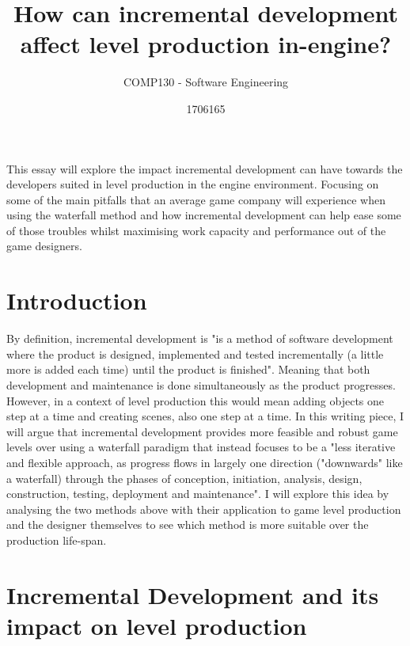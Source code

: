 \documentclass{scrartcl}
\title{How can incremental development affect level production in-engine?}
\subtitle{COMP130 - Software Engineering}
\author{1706165}
\begin{document}
\maketitle

This essay will explore the impact incremental development can have towards the developers suited in level production in the engine environment. Focusing on some of the main pitfalls that an average game company will experience when using the waterfall method and how incremental development can help ease some of those troubles whilst maximising work capacity and performance out of the game designers. 
\section{Introduction}

By definition, incremental development is \cite{1} "is a method of software development where the product is designed, implemented and tested incrementally (a little more is added each time) until the product is finished". Meaning that both development and maintenance is done simultaneously as the product progresses. However, in a context of level production this would mean adding objects one step at a time and creating scenes, also one step at a time. In this writing piece, I will argue that incremental development provides more feasible and robust game levels over using a waterfall paradigm that instead focuses to be a \cite{2} "less iterative and flexible approach, as progress flows in largely one direction ("downwards" like a waterfall) through the phases of conception, initiation, analysis, design, construction, testing, deployment and maintenance". I will explore this idea by analysing the two methods above with their application to game level production and the designer themselves to see which method is more suitable over the production life-span. 


\section{Incremental Development and its impact on level production}
\end{document}

